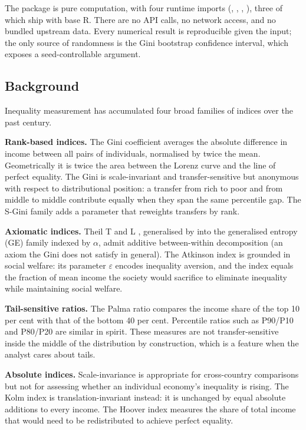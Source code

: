 The package is pure computation, with four runtime imports
(, , , ), three
of which ship with base R. There are no API calls, no network access,
and no bundled upstream data. Every numerical result is reproducible
given the input; the only source of randomness is the Gini bootstrap
confidence interval, which exposes a seed-controllable argument.

\subsection{Background}\label{background}

Inequality measurement has accumulated four broad families of indices
over the past century.

\textbf{Rank-based indices.} The Gini coefficient
\citep{gini1912variabilita} averages the absolute difference in income
between all pairs of individuals, normalised by twice the mean.
Geometrically it is twice the area between the Lorenz curve
\citep{lorenz1905methods} and the line of perfect equality. The Gini is
scale-invariant and transfer-sensitive but anonymous with respect to
distributional position: a transfer from rich to poor and from middle to
middle contribute equally when they span the same percentile gap. The
S-Gini family \citep{donaldson1980single} adds a parameter that
reweights transfers by rank.

\textbf{Axiomatic indices.} Theil T and L \citep{theil1967information},
generalised by \citet{shorrocks1980class} into the generalised entropy
(GE) family indexed by \(\alpha\), admit additive between-within
decomposition (an axiom the Gini does not satisfy in general). The
Atkinson index \citep{atkinson1970measurement} is grounded in social
welfare: its parameter \(\varepsilon\) encodes inequality aversion, and
the index equals the fraction of mean income the society would sacrifice
to eliminate inequality while maintaining social welfare.

\textbf{Tail-sensitive ratios.} The Palma ratio
\citep{palma2011homogeneous} compares the income share of the top 10 per
cent with that of the bottom 40 per cent. Percentile ratios such as
P90/P10 and P80/P20 are similar in spirit. These measures are not
transfer-sensitive inside the middle of the distribution by
construction, which is a feature when the analyst cares about tails.

\textbf{Absolute indices.} Scale-invariance is appropriate for
cross-country comparisons but not for assessing whether an individual
economy's inequality is rising. The Kolm index \citep{kolm1976unequal}
is translation-invariant instead: it is unchanged by equal absolute
additions to every income. The Hoover index measures the share of total
income that would need to be redistributed to achieve perfect equality.

